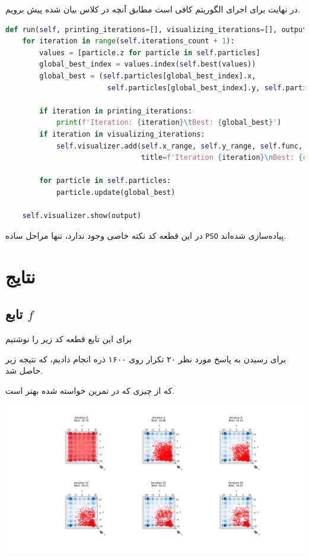 \documentclass[a4paper, 12pt]{article}
\begin{document}
در نهایت برای اجرای الگوریتم کافی است مطابق آنچه در کلاس بیان شده پیش برویم.

\LTR
\begin{lstlisting}[language=Python]
def run(self, printing_iterations=[], visualizing_iterations=[], output=None):
    for iteration in range(self.iterations_count + 1):
        values = [particle.z for particle in self.particles]
        global_best_index = values.index(self.best(values))
        global_best = (self.particles[global_best_index].x,
                        self.particles[global_best_index].y, self.particles[global_best_index].z)

        if iteration in printing_iterations:
            print(f'Iteration: {iteration}\tBest: {global_best}')
        if iteration in visualizing_iterations:
            self.visualizer.add(self.x_range, self.y_range, self.func, self.particles,
                                title=f'Iteration {iteration}\nBest: {round(global_best[2], 2)}')

        for particle in self.particles:
            particle.update(global_best)

    self.visualizer.show(output)
\end{lstlisting}
\RTL

در این قطعه کد نکته خاصی وجود ندارد، تنها مراحل ساده
\texttt{PSO}
پیاده‌سازی شده‌اند.

\newpage

\section{نتایج}

\subsection{تابع $f$}
برای این تابع قطعه کد زیر را نوشتیم

\LTR

\RTL

برای رسیدن به پاسخ مورد نظر ۲۰ تکرار روی ۱۶۰۰ ذره انجام دادیم، که نتیجه زیر حاصل شد.

\LTR

\RTL

که از چیزی که در تمرین خواسته شده بهتر است.

\begin{center}
    \includegraphics[width=1\textwidth]{results/f.png}
\end{center}
\end{document}
